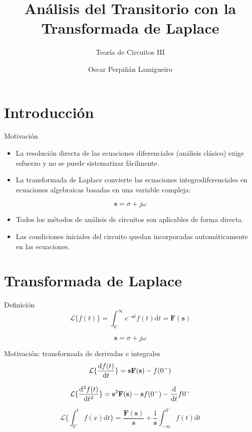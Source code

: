 \documentclass[aspectratio=169, usenames,svgnames,dvipsnames]{beamer}
\author{Oscar Perpiñán Lamigueiro}
\date{}
\title{Análisis del Transitorio con la Transformada de Laplace}
\subtitle{Teoría de Circuitos III}
\newcommand{\laplace}[1]{\mathbf{#1}(\mathbf{s})}
\newcommand{\slp}{\mathbf{s}}
\begin{document}
\maketitle

\section{Introducción}
\label{sec:org356ea2a}
\begin{frame}[label={sec:orga229ff0}]{Motivación}
\begin{itemize}
\item La resolución directa de las ecuaciones diferenciales (análisis clásico) exige esfuerzo y no se puede sistematizar fácilmente.
\item La transformada de Laplace convierte las ecuaciones integrodiferenciales en \alert{ecuaciones algebraicas} basadas en una variable compleja:
\end{itemize}
\[
\slp = \sigma + j\omega
\]
\begin{itemize}
\item Todos los \alert{métodos de análisis} de circuitos son \alert{aplicables} de forma directa.
\item Las \alert{condiciones iniciales} del circuito quedan incorporadas automáticamente en las ecuaciones.
\end{itemize}
\end{frame}

\section{Transformada de Laplace}
\label{sec:org06c2739}
\begin{frame}[label={sec:orgda0a503}]{Definición}
\[
  \mathcal{L}\{f(t)\} = \int_{0^-}^\infty e^{-\slp t} f(t) \mathrm{d}t = \laplace{F}
\]

\[
\slp = \sigma + j\omega
\]
\end{frame}

\begin{frame}[label={sec:org61de9b7}]{Motivación: transformada de derivadas e integrales}
\[
  \mathcal{L}\{\diff{f(t)}{t}\} =  \slp \mathbf{F}(\slp) - f(0^-)
\]

\[
  \mathcal{L}\{\diff[2]{f(t)}{t}\} = \slp^2 \laplace{F} - \slp f(0^-) - \diff*{f}{t}{0^-}
\]

\[
  \mathcal{L}\{\int_{0^-}^tf(x)\mathrm{d}t\} = \frac{\laplace{F}}{\slp} + \frac{1}{\slp} \int^{0^-}_{-\infty}f(t) \mathrm{d}t 
\]
\end{frame}
\end{document}
